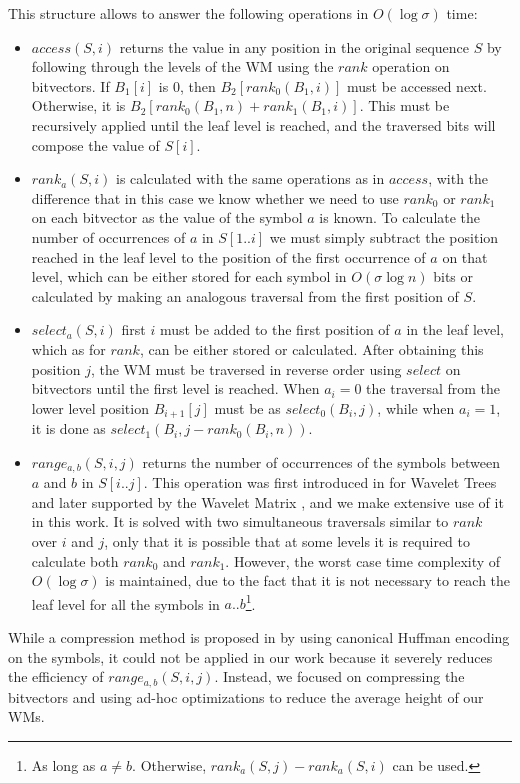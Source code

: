 \documentclass[runningheads]{llncs}
\begin{document}
This structure allows to answer the following operations in $O(\log\sigma)$ time:
\begin{itemize}
    \item $access(S,i)$ returns the value in any position in the original sequence $S$ by following through the levels of the WM using the $rank$ operation on bitvectors. If $B_1[i]$ is 0, then $B_2[rank_0(B_1,i)]$ must be accessed next. Otherwise, it is $B_2[rank_0(B_1,n) + rank_1(B_1,i)]$. This must be recursively applied until the leaf level is reached, and the traversed bits will compose the value of $S[i]$.
    \item $rank_a(S,i)$ is calculated with the same operations as in $access$, with the difference that in this case we know whether we need to use $rank_0$ or $rank_1$ on each bitvector as the value of the symbol $a$ is known. To calculate the number of occurrences of $a$ in $S[1..i]$ we must simply subtract the position reached in the leaf level to the position of the first occurrence of $a$ on that level, which can be either stored for each symbol in $O(\sigma\log n)$ bits or calculated by making an analogous traversal from the first position of $S$.
    \item $select_a(S,i)$ first $i$ must be added to the first position of $a$ in the leaf level, which as for $rank$, can be either stored or calculated. After obtaining this position $j$, the WM must be traversed in reverse order using $select$ on bitvectors until the first level is reached. When $a_i=0$ the traversal from the lower level position $B_{i+1}[j]$ must be as $select_0(B_i,j)$, while when $a_i=1$, it is done as $select_1(B_i,j-rank_0(B_{i},n))$.
    \item $range_{a,b}(S,i,j)$ returns the number of occurrences of the symbols between $a$ and $b$ in $S[i..j]$. This operation was first introduced in \cite{gagie2012new} for Wavelet Trees and later supported by the Wavelet Matrix \cite{CNO15}, and we make extensive use of it in this work. It is solved with two simultaneous traversals similar to $rank$ over $i$ and $j$, only that it is possible that at some levels it is required to calculate both $rank_0$ and $rank_1$. However, the worst case time complexity of $O(\log\sigma)$ is maintained, due to the fact that it is not necessary to reach the leaf level for all the symbols in $a..b$\footnote{As long as $a\neq b$. Otherwise, $rank_a(S,j)-rank_a(S,i)$ can be used.}.
\end{itemize}

While a compression method is proposed in \cite{CNO15} by using canonical Huffman encoding on the symbols, it could not be applied in our work because it severely reduces the efficiency of $range_{a,b}(S,i,j)$. Instead, we focused on compressing the bitvectors and using ad-hoc optimizations to reduce the average height of our WMs.
\end{document}
